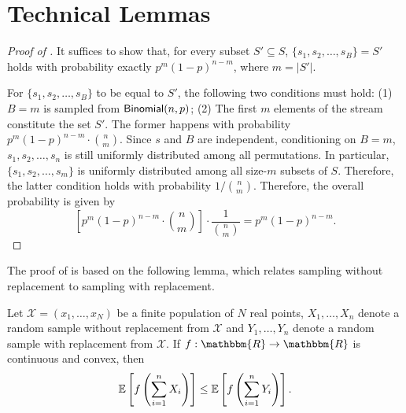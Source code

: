 \section{Technical Lemmas}\label{sec:technical-lemmas}
\lemmasubsample*

\begin{proof}[Proof of ]
    It suffices to show that, for every subset $S' \subseteq S$, $\{s_1, s_2, \ldots, s_B\} = S'$ holds with probability exactly $p^{m}(1-p)^{n-m}$, where $m = |S'|$.

    For $\{s_1, s_2, \ldots, s_B\}$ to be equal to $S'$, the following two conditions must hold: (1) $B = m$ is sampled from $\mathsf{Binomial}(n, p)$; (2) The first $m$ elements of the stream constitute the set $S'$. The former happens with probability $p^{m}(1-p)^{n-m} \cdot \binom{n}{m}$. Since $s$ and $B$ are independent, conditioning on $B = m$, $s_1, s_2, \ldots, s_n$ is still uniformly distributed among all permutations. In particular, $\{s_1, s_2, \ldots, s_m\}$ is uniformly distributed among all size-$m$ subsets of $S$. Therefore, the latter condition holds with probability $1 / \binom{n}{m}$. Therefore, the overall probability is given by
    \[
        \left[p^{m}(1-p)^{n-m} \cdot \binom{n}{m}\right] \cdot\frac{1}{\binom{n}{m}} = p^{m}(1-p)^{n-m}.
    \]
\end{proof}

\subsetrankconcentration*

The proof of  is based on the following lemma, which relates sampling without replacement to sampling with replacement.
\begin{lemma}\label{lemma.cite}
    Let $\mathcal{X} = (x_1, \ldots,  x_N)$ be a finite population of $N$ real points, $X_1, \ldots , X_n$ denote a random sample without replacement from $\mathcal{X}$ and $Y_1, \ldots , Y_n$ denote a random sample with replacement from $\mathcal{X}$. If $f : \mathbbm{R} \rightarrow \mathbbm{R}$ is continuous and convex, then
    \[
        \operatorname*{\mathbb{E}}_{}\left[f\left(\sum_{i=1}^n X_i\right)\right]
    \le \operatorname*{\mathbb{E}}_{}\left[f\left(\sum_{i=1}^n Y_i\right)\right].
    \]
\end{lemma}
 
